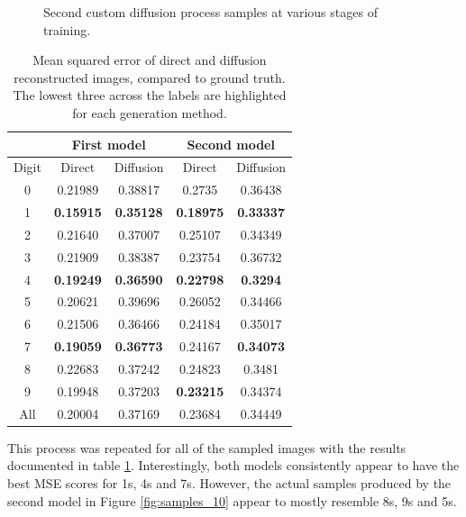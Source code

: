 \documentclass[12pt]{article}
\begin{document}
\begin{figure}[hp]
    \caption{Second custom diffusion process samples at various stages of training.}
    \label{fig:cond_generation}
\end{figure}


\begin{table}[hp]
    \centering
    \begin{tabular}{| c || c | c || c | c |}
        \hline
         & \multicolumn{2}{|c||}{First model} & \multicolumn{2}{|c|}{Second model} \\
        \hline
        Digit & Direct & Diffusion & Direct & Diffusion \\
        \hline
        0 & 0.21989 & 0.38817 & 0.2735 & 0.36438 \\
        \hline
        1 & \textbf{0.15915} & \textbf{0.35128} & \textbf{0.18975} & \textbf{0.33337} \\
        \hline
        2 & 0.21640 & 0.37007 & 0.25107 & 0.34349 \\
        \hline
        3 & 0.21909 & 0.38387 & 0.23754 & 0.36732 \\
        \hline
        4 & \textbf{0.19249} & \textbf{0.36590} & \textbf{0.22798} & \textbf{0.3294} \\
        \hline
        5 & 0.20621 & 0.39696 & 0.26052 & 0.34466 \\
        \hline
        6 & 0.21506 & 0.36466 & 0.24184 & 0.35017 \\
        \hline
        7 & \textbf{0.19059} & \textbf{0.36773} & 0.24167 & \textbf{0.34073} \\
        \hline
        8 & 0.22683 & 0.37242 & 0.24823 & 0.3481 \\
        \hline
        9 & 0.19948 & 0.37203 & \textbf{0.23215} & 0.34374 \\
        \hline
        All & 0.20004 & 0.37169 & 0.23684 & 0.34449 \\
        \hline

    \end{tabular}
    \caption{Mean squared error of direct and diffusion reconstructed images, compared to ground truth. The lowest three across the labels are highlighted for each generation method.}
    \label{tab:mse_reconstruction}
\end{table}

This process was repeated for all of the sampled images with the results documented in table \ref{tab:mse_reconstruction}.
Interestingly, both models consistently appear to have the best MSE scores for 1s, 4s and 7s.
However, the actual samples produced by the second model in Figure \ref{fig:samples_10} appear to mostly resemble 8s, 9s and 5s.
\end{document}
